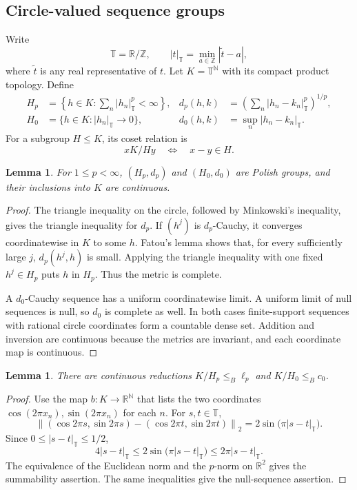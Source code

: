 \documentclass[11pt]{article}
\numberwithin{equation}{section}
\newtheorem{lemma}[theorem]{Lemma}
\theoremstyle{definition}
\newcommand{\N}{\mathbb N}
\newcommand{\R}{\mathbb R}
\newcommand{\Z}{\mathbb Z}
\newcommand{\T}{\mathbb T}
\newcommand{\leB}{\mathrel{\leq_B}}
\begin{document}
\subsection{Circle-valued sequence groups}
Write
\[
 \T=\R/\Z,\qquad
 |t|_{\T}=\min_{a\in\Z}|\widetilde t-a|,
\]
where $\widetilde t$ is any real representative of $t$.
Let $K=\T^\N$ with its compact product topology. Define
\begin{align*}
 H_p&=\left\{h\in K:\sum_n|h_n|_\T^p<\infty\right\},
 &d_p(h,k)&=\left(\sum_n|h_n-k_n|_\T^p\right)^{1/p},\\
 H_0&=\{h\in K:|h_n|_\T\to0\},
 &d_0(h,k)&=\sup_n|h_n-k_n|_\T.
\end{align*}
For a subgroup $H\le K$, its coset relation is
\[
 x\mathrel{K/H}y\quad\Longleftrightarrow\quad x-y\in H.
\]

\begin{lemma}\label{lem:Polish-H}
For $1\le p<\infty$, $(H_p,d_p)$ and $(H_0,d_0)$ are Polish groups,
and their inclusions into $K$ are continuous.
\end{lemma}
\begin{proof}
The triangle inequality on the circle, followed by Minkowski's inequality,
gives the triangle inequality for $d_p$. If $(h^j)$ is $d_p$-Cauchy, it
converges coordinatewise in $K$ to some $h$. Fatou's lemma shows that,
for every sufficiently large $j$, $d_p(h^j,h)$ is small. Applying the
triangle inequality with one fixed $h^j\in H_p$ puts $h$ in $H_p$.
Thus the metric is complete.

A $d_0$-Cauchy sequence has a uniform coordinatewise limit. A uniform
limit of null sequences is null, so $d_0$ is complete as well. In both
cases finite-support sequences with rational circle coordinates form a
countable dense set. Addition and inversion are continuous because the
metrics are invariant, and each coordinate map is continuous.
\end{proof}

\begin{lemma}\label{lem:compact-replacement}
There are continuous reductions $K/H_p\leB \ell_p$ and
$K/H_0\leB c_0$.
\end{lemma}
\begin{proof}
Use the map $b:K\to\R^\N$ that lists the two coordinates
$\cos(2\pi x_n),\sin(2\pi x_n)$ for each $n$. For $s,t\in\T$,
\[
 \left\|(\cos2\pi s,\sin2\pi s)
       -(\cos2\pi t,\sin2\pi t)\right\|_2
 =2\sin\bigl(\pi|s-t|_\T\bigr).
\]
Since $0\le|s-t|_\T\le1/2$,
\[
 4|s-t|_\T\le2\sin\bigl(\pi|s-t|_\T\bigr)
             \le2\pi|s-t|_\T.
\]
The equivalence of the Euclidean norm and the $p$-norm on $\R^2$
gives the summability assertion. The same inequalities give the
null-sequence assertion.
\end{proof}
\end{document}
